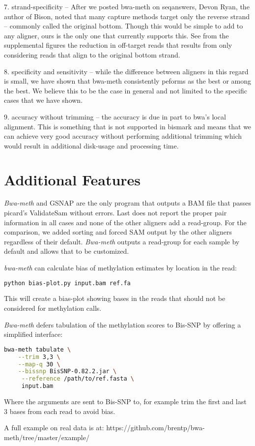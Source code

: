 \documentclass[12pt]{article}
\begin{document}
7. strand-specificity -- After we posted bwa-meth on seqanswers, Devon Ryan,
   the author of Bison, noted that many capture methods target only the reverse
   strand -- commonly called the original bottom. Though this would be simple to
   add to any aligner, ours is the only one that currently supports this. See
   from the supplemental figures the reduction in off-target reads that results
   from only considering reads that align to the original bottom strand.

8. specificity and sensitivity -- while the difference between aligners in
   this regard is small, we have shown that bwa-meth consistently peforms as the
   best or among the best. We believe this to be the case in general and not
   limited to the specific cases that we have shown.

9. accuracy without trimming -- the accuracy is due in part to bwa's local
   alignment. This is something that is not supported in bismark and means that
   we can achieve very good accuracy without performing additional trimming
   which would result in additional disk-usage and processing time.

\section{Additional Features}
\textit{Bwa-meth} and GSNAP are the only program that outputs a BAM file that passes picard's ValidateSam without errors.
Last does not report the proper pair information in all cases and none of the other aligners add a read-group.
For the comparison, we added sorting and forced SAM output by the other aligners regardless of their default.
\textit{Bwa-meth} outputs a read-group for each sample by default and allows that to be customized.

\textit{bwa-meth} can calculate bias of methylation estimates by location in the read:

\begin{lstlisting}[language=bash]
python bias-plot.py input.bam ref.fa
\end{lstlisting}
This will create a bias-plot showing bases in the reads that should not be considered
for methylation calls.

\textit{Bwa-meth} defers tabulation of the methylation scores to Bis-SNP \cite{bissnp} by offering a simplified interface:
\begin{lstlisting}[language=bash]
bwa-meth tabulate \
    --trim 3,3 \
    --map-q 30 \
    --bissnp BisSNP-0.82.2.jar \
     --reference /path/to/ref.fasta \
     input.bam
\end{lstlisting}
Where the arguments are sent to Bis-SNP to, for example trim the first and last 3 bases
from each read to avoid bias.

A full example on real data is at:
https://github.com/brentp/bwa-meth/tree/master/example/


    
\end{document}
